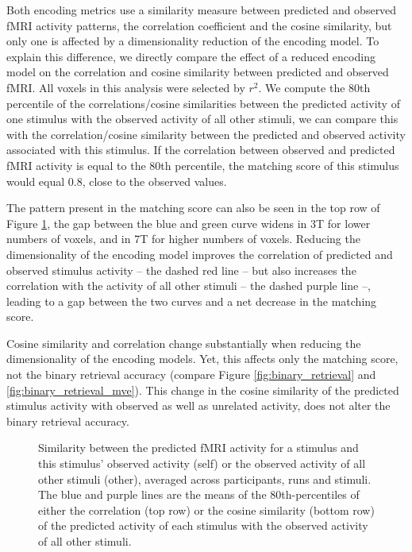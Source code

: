 Both encoding metrics use a similarity measure between predicted and observed
f{MRI} activity patterns, the correlation coefficient and the cosine similarity, but only
one is affected by a dimensionality reduction of the encoding model. To explain
this difference, we directly compare the effect of a reduced encoding model on
the correlation and cosine similarity between predicted and observed f{MRI}.
All voxels in this analysis were selected by $r^2$.
We compute the 80th percentile of the correlations/cosine similarities between
the predicted activity of one stimulus with the observed activity of all other
stimuli, we can compare this with the correlation/cosine similarity between the
predicted and observed activity associated with this stimulus. 
If the correlation between observed and predicted f{MRI} activity is equal to
the 80th percentile, the matching score of this stimulus would equal $0.8$,
close to the observed values.

The pattern present in the matching score can also be seen in the top row of Figure
\ref{fig:corr_cossim_differences}, the gap between the blue and green curve
widens in 3T for lower numbers of voxels, and in 7T for higher numbers of
voxels. Reducing the dimensionality of the encoding model improves the
correlation of predicted and observed stimulus activity -- the dashed red line
-- but also increases the correlation with the activity of all other stimuli --
the dashed purple line --, leading to a gap between the two curves and a net
decrease in the matching score.

Cosine similarity and correlation change substantially when reducing the
dimensionality of the encoding models. Yet, this affects only the matching score, not the binary
retrieval accuracy (compare Figure \ref{fig:binary_retrieval} and
\ref{fig:binary_retrieval_mve}). This change in the cosine similarity of the predicted
stimulus activity with observed as well as unrelated activity, does not alter
the binary retrieval accuracy.


\begin{figure}
  \centering
  \def\svgwidth{\linewidth}
  
	
  \caption{Similarity between the predicted f{MRI} activity for a stimulus and
  this stimulus' observed activity (self) or the observed activity of all other
  stimuli (other), averaged across participants, runs and stimuli. The blue and purple
  lines are the means of the 80th-percentiles of either the correlation (top row) or the
  cosine similarity (bottom row) of the predicted activity of each stimulus with the observed
  activity of all other stimuli.}

 \label{fig:corr_cossim_differences}
\end{figure}

